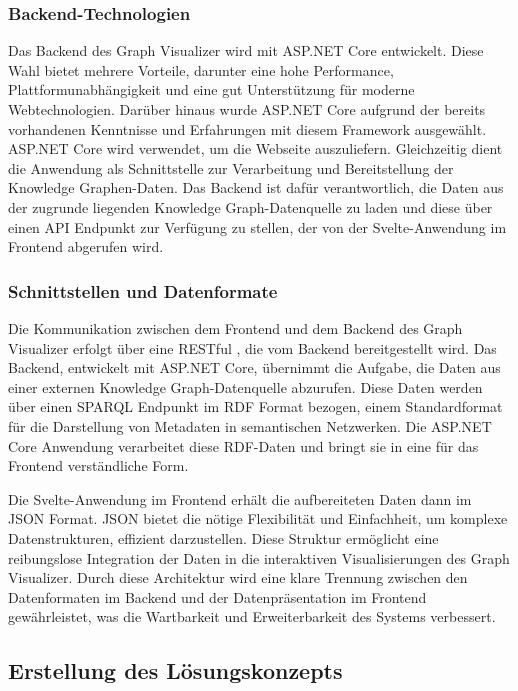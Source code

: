\subsubsection{Backend-Technologien}

Das Backend des Graph Visualizer wird mit ASP.NET Core entwickelt. Diese Wahl bietet mehrere Vorteile, darunter eine hohe Performance, Plattformunabhängigkeit und eine gut Unterstützung für moderne Webtechnologien. Darüber hinaus wurde ASP.NET Core aufgrund der bereits vorhandenen Kenntnisse und Erfahrungen mit diesem Framework ausgewählt. ASP.NET Core wird verwendet, um die Webseite auszuliefern. Gleichzeitig dient die Anwendung als Schnittstelle zur Verarbeitung und Bereitstellung der Knowledge Graphen-Daten. Das Backend ist dafür verantwortlich, die Daten aus der zugrunde liegenden Knowledge Graph-Datenquelle zu laden und diese über einen \ac{API} Endpunkt zur Verfügung zu stellen, der von der Svelte-Anwendung im Frontend abgerufen wird.

\subsubsection{Schnittstellen und Datenformate}

Die Kommunikation zwischen dem Frontend und dem Backend des Graph Visualizer erfolgt über eine RESTful , die vom Backend bereitgestellt wird. Das Backend, entwickelt mit ASP.NET Core, übernimmt die Aufgabe, die Daten aus einer externen Knowledge Graph-Datenquelle abzurufen. Diese Daten werden über einen \ac{SPARQL} Endpunkt im \ac{RDF} Format bezogen, einem Standardformat für die Darstellung von Metadaten in semantischen Netzwerken. Die ASP.NET Core Anwendung verarbeitet diese RDF-Daten und bringt sie in eine für das Frontend verständliche Form.

Die Svelte-Anwendung im Frontend erhält die aufbereiteten Daten dann im \ac{JSON} Format. \ac{JSON} bietet die nötige Flexibilität und Einfachheit, um komplexe Datenstrukturen, effizient darzustellen. Diese Struktur ermöglicht eine reibungslose Integration der Daten in die interaktiven Visualisierungen des Graph Visualizer. Durch diese Architektur wird eine klare Trennung zwischen den Datenformaten im Backend und der Datenpräsentation im Frontend gewährleistet, was die Wartbarkeit und Erweiterbarkeit des Systems verbessert.

\subsection{Erstellung des Lösungskonzepts}

